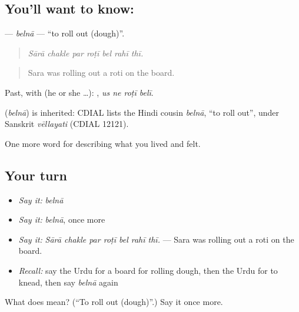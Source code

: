 \subsection*{You'll want to know: }
\textbf{} — \emph{belnā} — \textquotedblleft{}to roll out (dough)\textquotedblright{}.

\begin{quote}
      
\end{quote}

\begin{quote}
\emph{Sārā chakle par roṭī bel rahī thī.}
\end{quote}

\begin{quote}
Sara was rolling out a roti on the board.
\end{quote}

Past, with  (he or she …):    , \emph{us ne roṭī belī}.

\begin{cousinweb}
\textbf{} (\emph{belnā}) is inherited: CDIAL lists the Hindi cousin \emph{belnā}, \textquotedblleft{}to roll out\textquotedblright{}, under Sanskrit \emph{vēllayati} (CDIAL 12121).
\end{cousinweb}

\begin{grammarlens}[title={What you've built}]
One more word for describing what you lived and felt.
\end{grammarlens}

\subsection*{Your turn}
\begin{itemize}
\raggedright
  \item \emph{Say it:} \emph{belnā}
  \item \emph{Say it:} \emph{belnā}, once more
  \item \emph{Say it:} \emph{Sārā chakle par roṭī bel rahī thī.} — Sara was rolling out a roti on the board.
  \item \emph{Recall:} say the Urdu for a board for rolling dough, then the Urdu for to knead, then say \emph{belnā} again
\end{itemize}

\begin{tcolorbox}[breakable,colback=teal!4,colframe=teal!35!black,title={Before you move on}]
What does  mean? (\textquotedblleft{}To roll out (dough)\textquotedblright{}.) Say it once more.
\end{tcolorbox}
